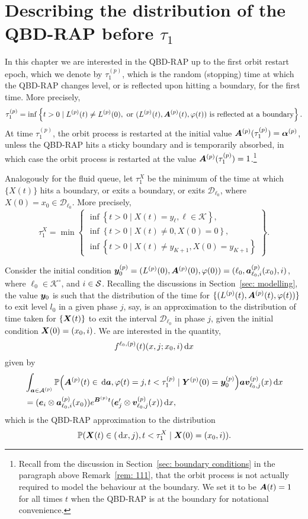 \section{Describing the distribution of the QBD-RAP before \(\tau_1\)}\label{sec: qbd dists}
In this chapter we are interested in the QBD-RAP up to the first orbit restart epoch, which we denote by \(\tau_1^{(p)}\), which is the random (stopping) time at which the QBD-RAP changes level, or is reflected upon hitting a boundary, for the first time. More precisely, 
\[\tau_1^{(p)} = \inf\left\{t>0\mid L^{(p)}(t)\neq L^{(p)}(0),\mbox{ or }(L^{(p)}(t),\boldsymbol A^{(p)}(t),\varphi(t))\mbox{ is reflected at a boundary}\right\}.\]
At time \(\tau_1^{(p)}\), the orbit process is restarted at the initial value \(\boldsymbol A^{(p)}(\tau_1^{(p)}) = \boldsymbol \alpha^{(p)}\), unless the QBD-RAP hits a sticky boundary and is temporarily absorbed, in which case the orbit process is restarted at the value \(\boldsymbol A^{(p)}(\tau_1^{(p)}) = 1\).\footnote{Recall from the discussion in Section~\ref{sec: boundary conditions} in the paragraph above Remark~\ref{rem: 111}, that the orbit process is not actually required to model the behaviour at the boundary. We set it to be \(\boldsymbol A(t) =1\) for all times \(t\) when the QBD-RAP is at the boundary for notational convenience.}

Analogously for the fluid queue, let \(\tau_1^X\) be the minimum of the time at which \(\{X(t)\}\) hits a boundary, or exits a boundary, or exits \(\mathcal D_{\ell_0}\), where \(X(0)=x_0\in\mathcal D_{\ell_0}\). More precisely, 
\[\tau_1^X = \min\left\{\begin{array}{c}\inf\left\{t>0\mid X(t)=y_{\ell}, \ell\in\mathcal K\right\}, \\ \inf\left\{t>0 \mid X(t) \neq 0, X(0)=0\right\}, \\ \inf\left\{t>0 \mid X(t) \neq y_{K+1}, X(0)=y_{K+1}\right\} \end{array} \right\}.\]

Consider the initial condition \(\boldsymbol y_0^{(p)} = (L^{(p)}(0),\boldsymbol A^{(p)}(0),\varphi(0))=(\ell_0,\boldsymbol a^{(p)}_{\ell_0,i}(x_0),i)\), where \(\ell_0\in\mathcal K^\circ\), and \(i\in\mathcal{S}\). Recalling the discussions in Section~\ref{sec: modelling}, the value \(\boldsymbol y_0\) is such that the distribution of the time for \(\{(L^{(p)}(t),\boldsymbol A^{(p)}(t),\varphi(t))\}\) to exit level \(l_0\) in a given phase \(j\), say, is an approximation to the distribution of time taken for \(\{\boldsymbol X(t)\}\) to exit the interval \(\mathcal D_{\ell_0}\) in phase \(j\), given the initial condition \(\boldsymbol X(0)=(x_0,i)\). We are interested in the quantity, \[f^{\ell_0,(p)}(t)(x,j;x_0,i)\, \mathrm{d} x\] given by
\begin{align}
	&\int_{\boldsymbol a \in \mathcal A^{(p)}}\mathbb P\Big(\boldsymbol A^{(p)}(t)\in \, \mathrm{d} \boldsymbol a, \varphi(t) = j , t<\tau_1^{(p)}\nonumber
	\mid \boldsymbol Y^{(p)}(0) = \boldsymbol y_0^{(p)}\Big)
	\boldsymbol a{\boldsymbol v}_{\ell_0,j}^{(p)}(x)\, \mathrm{d} x \nonumber 
	\\&= (\boldsymbol e_i\otimes \boldsymbol  a_{\ell_0,i}^{(p)}(x_0)) e^{\boldsymbol{B}^{(p)}t}(\boldsymbol e_j'{} \otimes {\boldsymbol v}_{\ell_0,j}^{(p)}( x))\, \mathrm{d} x, \label{eqn: ldll}
\end{align}
which is the QBD-RAP approximation to the distribution 
\[\mathbb P(\boldsymbol X(t)\in (\, \mathrm{d} x,j), t<\tau_1^X \mid \boldsymbol X(0) = (x_0, i)).\]

